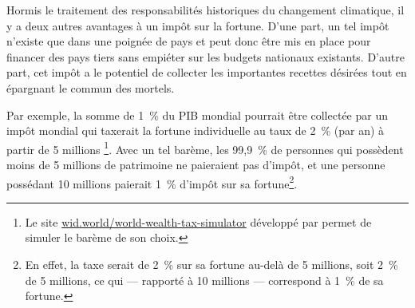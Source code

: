 \documentclass[a5paper,french,openany]{memoir}
\begin{document}
Hormis le traitement des responsabilités historiques du changement climatique, il y a deux autres avantages à un impôt sur la fortune. D'une part, un tel impôt n'existe que dans une poignée de pays et peut donc être mis en place pour financer des pays tiers sans empiéter sur les budgets nationaux existants. D'autre part, cet impôt a le potentiel de collecter %
les importantes recettes désirées tout en épargnant le commun des mortels. %

Par exemple, la somme de 1~\% du PIB mondial pourrait être collectée par un impôt mondial qui taxerait la fortune individuelle au taux de 2~\% (par an) à partir de 5 millions%
\footnote{
Le site \href{https://wid.world/world-wealth-tax-simulator/}{wid.world/world-wealth-tax-simulator} développé par \cite{chancel_world_2022} permet de simuler le barème de son choix.}. %
Avec un tel barème, les 99,9~\% de personnes qui possèdent moins de 5 millions de patrimoine ne paieraient pas d'impôt, et une personne possédant 10 millions paierait 1~\% d'impôt sur sa fortune\footnote{En effet, la taxe serait de 2~\% sur sa fortune au-delà de 5 millions, soit 2~\% de 5 millions, ce qui --- rapporté à 10 millions --- correspond à 1~\% de sa fortune.}. 
\end{document}

